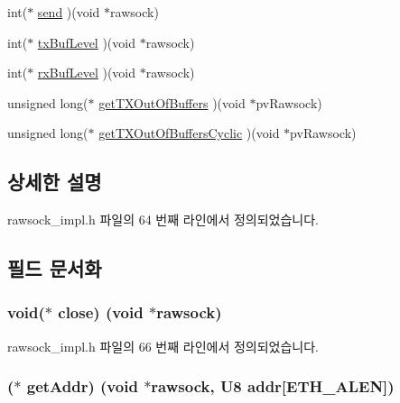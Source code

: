 \begin{DoxyCompactItemize}
int($\ast$ \hyperlink{structrawsock__cb__t_ae6202a72f83a5d92e126344ed22470a1}{send} )(void $\ast$rawsock)
\item 
int($\ast$ \hyperlink{structrawsock__cb__t_a3d3805c9ca1a1c658c648699ea3fdce6}{tx\+Buf\+Level} )(void $\ast$rawsock)
\item 
int($\ast$ \hyperlink{structrawsock__cb__t_ae53f5e072b7695b093ebd9a709f945b4}{rx\+Buf\+Level} )(void $\ast$rawsock)
\item 
unsigned long($\ast$ \hyperlink{structrawsock__cb__t_a224915eda51e77d90c9e53bad4bd3ee9}{get\+T\+X\+Out\+Of\+Buffers} )(void $\ast$pv\+Rawsock)
\item 
unsigned long($\ast$ \hyperlink{structrawsock__cb__t_a1551298f6cf98c1bee5479535d90e893}{get\+T\+X\+Out\+Of\+Buffers\+Cyclic} )(void $\ast$pv\+Rawsock)
\end{DoxyCompactItemize}


\subsection{상세한 설명}


rawsock\+\_\+impl.\+h 파일의 64 번째 라인에서 정의되었습니다.



\subsection{필드 문서화}
\subsubsection[{\texorpdfstring{close}{close}}]{\setlength{\rightskip}{0pt plus 5cm}void($\ast$ close) (void $\ast$rawsock)}\hypertarget{structrawsock__cb__t_a985e065be665d4efc528911317edb3fa}{}\label{structrawsock__cb__t_a985e065be665d4efc528911317edb3fa}


rawsock\+\_\+impl.\+h 파일의 66 번째 라인에서 정의되었습니다.

\subsubsection[{\texorpdfstring{get\+Addr}{getAddr}}]{($\ast$ get\+Addr) (void $\ast$rawsock, {\bf U8} addr\mbox{[}{\bf E\+T\+H\+\_\+\+A\+L\+EN}\mbox{]})}\hypertarget{structrawsock__cb__t_a3e0f8de868f8572b6af34c09d8d2ee41}{}\label{structrawsock__cb__t_a3e0f8de868f8572b6af34c09d8d2ee41}


